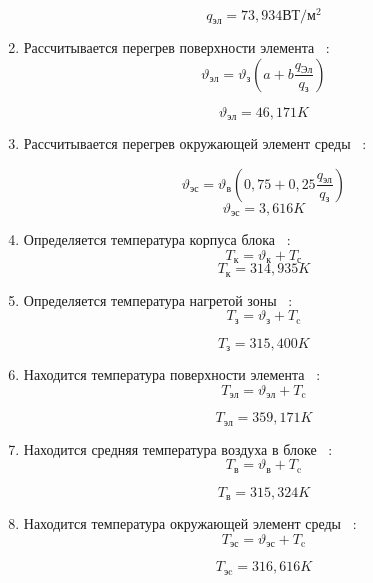 \begin{enumerate}[label={\arabic*.}]
        $$q\mathrm{_{эл}} =73,934\mathrm{ВТ/м^2} $$

 \item Рассчитывается перегрев поверхности элемента ~\cite{Rotkop1976}:
 \begin{equation}
\vartheta\mathrm{_{эл}} = \vartheta\mathrm{_{з}}(a + b \frac{q\mathrm{_{Эл}}}{q\mathrm{_{з}}})
\end{equation}

$$\vartheta\mathrm{_{эл}} =46,171K$$

\item Рассчитывается перегрев окружающей элемент среды ~\cite{Rotkop1976}:

      \begin{equation}
      \vartheta\mathrm{_{эс}} = \vartheta\mathrm{_в}(0,75 + 0,25\frac{q\mathrm{_{эл}}}{q\mathrm{_{з}}})
    \end{equation}
    $$\vartheta\mathrm{_{эс}} = 3,616K$$

  \item Определяется температура корпуса блока ~\cite{Rotkop1976}:
    \begin{equation}
      T\mathrm{_к} = \vartheta\mathrm{_{к}} + T\mathrm{_с}
    \end{equation}
    $$T\mathrm{_{к}} = 314,935 K$$
    
\item Определяется температура нагретой зоны ~\cite{Rotkop1976}:
    \begin{equation}
      T\mathrm{_з} = \vartheta\mathrm{_з} + T\mathrm{_c}
    \end{equation}

    $$T\mathrm{_з} = 315,400 K$$
  \item Находится температура поверхности элемента ~\cite{Rotkop1976}:
    \begin{equation}
      T\mathrm{_{эл}} = \vartheta\mathrm{_{эл}} + T\mathrm{_c}
    \end{equation}

    $$T\mathrm{_{эл}} = 359,171 K$$

  \item Находится средняя температура воздуха в блоке ~\cite{Rotkop1976}:
    \begin{equation}
      T\mathrm{_{в}} = \vartheta\mathrm{_{в}} + T\mathrm{_c}
    \end{equation}

    $$T\mathrm{_{в}} = 315,324 K$$

  \item Находится температура окружающей элемент среды ~\cite{Rotkop1976}:
    \begin{equation}
      T\mathrm{_{эс}} = \vartheta\mathrm{_{эс}} + T\mathrm{_c}
    \end{equation}

    $$T\mathrm{_{эc}} = 316,616 K$$
\end{enumerate}
 